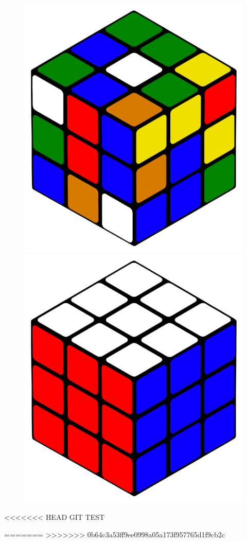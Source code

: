 \documentclass[12pt,a4paper, usenames, dvipsnames]{scrartcl}
\begin{document}
\begin{figure}[h]
\includegraphics[scale=0.09]{3x3scrambled.png}
\includegraphics[scale=0.09]{3x3solved.png}
\end{figure}

<<<<<<< HEAD
GIT TEST

=======
>>>>>>> 0b64c3a53ff9ee0998a05a173f957765d1f9cb2c
\end{document}
